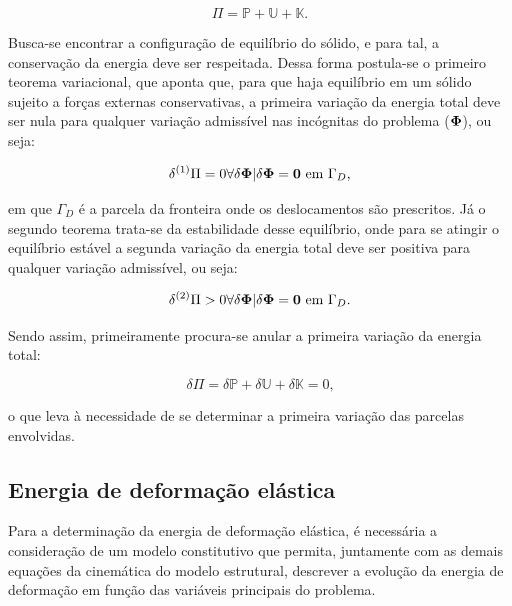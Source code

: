 \begin{equation}
    \Pi=\mathbb{P}+\mathbb{U}+\mathbb{K}\text{.}
    \label{FuncionalEnergia}
\end{equation}

Busca-se encontrar a configuração de equilíbrio do sólido, e para tal, a conservação da energia deve ser respeitada. Dessa forma postula-se o primeiro teorema variacional, que aponta que, para que haja equilíbrio em um sólido sujeito a forças externas conservativas, a primeira variação da energia total deve ser nula para qualquer variação admissível nas incógnitas do problema ($\boldsymbol{\Phi}$), ou seja:

\begin{equation}
    \delta^{(1)}\Pi=0\forall\delta\boldsymbol{\Phi}|\delta\boldsymbol{\Phi}=\boldsymbol{0}\text{ em }\Gamma_D\text{,}
\end{equation}

\noindent em que $\Gamma_D$ é a parcela da fronteira onde os deslocamentos são prescritos. Já o segundo teorema trata-se da estabilidade desse equilíbrio, onde para se atingir o equilíbrio estável a segunda variação da energia total deve ser positiva para qualquer variação admissível, ou seja:

\begin{equation}
    \delta^{(2)}\Pi>0\forall\delta\boldsymbol{\Phi}|\delta\boldsymbol{\Phi}=\boldsymbol{0}\text{ em }\Gamma_D\text{.}
\end{equation}

Sendo assim, primeiramente procura-se anular a primeira variação da energia total:

\begin{equation}
    \delta\Pi=\delta\mathbb{P}+\delta\mathbb{U}+\delta\mathbb{K}=0\text{,}
\end{equation}

\noindent o que leva à necessidade de se determinar a primeira variação das parcelas envolvidas.

\subsection{Energia de deformação elástica}

Para a determinação da energia de deformação elástica, é necessária a consideração de um modelo constitutivo que permita, juntamente com as demais equações da cinemática do modelo estrutural, descrever a evolução da energia de deformação em função das variáveis principais do problema.

